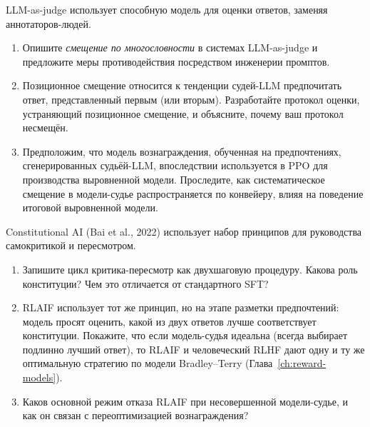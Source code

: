 \begin{exercise}
\label{ex:llm-as-judge}
LLM-as-judge использует способную модель для оценки ответов, заменяя аннотаторов-людей.
\begin{enumerate}
  \item Опишите \emph{смещение по многословности} в системах LLM-as-judge и предложите меры противодействия посредством инженерии промптов.
  \item Позиционное смещение относится к тенденции судей-LLM предпочитать ответ, представленный первым (или вторым). Разработайте протокол оценки, устраняющий позиционное смещение, и объясните, почему ваш протокол несмещён.
  \item Предположим, что модель вознаграждения, обученная на предпочтениях, сгенерированных судьёй-LLM, впоследствии используется в PPO для производства выровненной модели. Проследите, как систематическое смещение в модели-судье распространяется по конвейеру, влияя на поведение итоговой выровненной модели.
\end{enumerate}
\end{exercise}

\begin{exercise}
\label{ex:constitutional-ai}
Constitutional AI (Bai et al., 2022) использует набор принципов для руководства самокритикой и пересмотром.
\begin{enumerate}
  \item Запишите цикл критика-пересмотр как двухшаговую процедуру. Какова роль конституции? Чем это отличается от стандартного SFT?
  \item RLAIF использует тот же принцип, но на этапе разметки предпочтений: модель просят оценить, какой из двух ответов лучше соответствует конституции. Покажите, что если модель-судья идеальна (всегда выбирает подлинно лучший ответ), то RLAIF и человеческий RLHF дают одну и ту же оптимальную стратегию по модели Bradley--Terry (Глава~\ref{ch:reward-models}).
  \item Каков основной режим отказа RLAIF при несовершенной модели-судье, и как он связан с переоптимизацией вознаграждения?
\end{enumerate}
\end{exercise}

